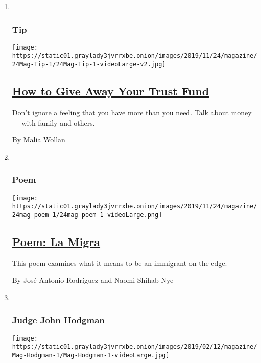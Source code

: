 \begin{enumerate}
\def\labelenumi{\arabic{enumi}.}
\item ~
  \hypertarget{tip}{%
  \subsubsection{Tip}\label{tip}}

  \texttt{[image: https://static01.graylady3jvrrxbe.onion/images/2019/11/24/magazine/24Mag-Tip-1/24Mag-Tip-1-videoLarge-v2.jpg]}

  \hypertarget{how-to-give-away-your-trust-fund}{%
  \subsection{\texorpdfstring{\href{/2019/11/21/magazine/resource-generation.html}{How
  to Give Away Your Trust
  Fund}}{How to Give Away Your Trust Fund}}\label{how-to-give-away-your-trust-fund}}

  Don't ignore a feeling that you have more than you need. Talk about
  money --- with family and others.

  By Malia Wollan
\item ~
  \hypertarget{poem}{%
  \subsubsection{Poem}\label{poem}}

  \texttt{[image: https://static01.graylady3jvrrxbe.onion/images/2019/11/24/magazine/24mag-poem-1/24mag-poem-1-videoLarge.png]}

  \hypertarget{poem-la-migra}{%
  \subsection{\texorpdfstring{\href{/2019/11/21/magazine/poem-la-migra.html}{Poem:
  La Migra}}{Poem: La Migra}}\label{poem-la-migra}}

  This poem examines what it means to be an immigrant on the edge.

  By José Antonio Rodríguez and Naomi Shihab Nye
\item ~
  \hypertarget{judge-john-hodgman}{%
  \subsubsection{Judge John Hodgman}\label{judge-john-hodgman}}

  \texttt{[image: https://static01.graylady3jvrrxbe.onion/images/2019/02/12/magazine/Mag-Hodgman-1/Mag-Hodgman-1-videoLarge.jpg]}


\end{enumerate}
